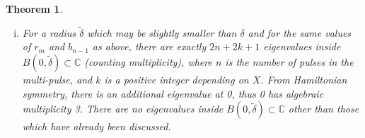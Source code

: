 \documentclass[12pt]{article}
\def\C{{\mathbb C}}
\newtheorem{theorem}{Theorem}
\begin{document}
\begin{theorem}
\begin{enumerate}[(i)]
The remainder term cannot move these off of the imaginary axis.

\item For a radius $\tilde{\delta}$ which may be slightly smaller than $\delta$ and for the same values of $r_m$ and $b_{n-1}$ as above, there are exactly $2n + 2k + 1$ eigenvalues inside $B(0, \tilde{\delta}) \subset \C$ (counting multiplicity), where $n$ is the number of pulses in the multi-pulse, and $k$ is a positive integer depending on $X$. From Hamiltonian symmetry, there is an additional eigenvalue at 0, thus 0 has algebraic multiplicity 3. There are no eigenvalues inside $B(0, \tilde{\delta}) \subset \C$ other than those which have already been discussed.

\end{enumerate}
\end{theorem}









\end{document}

